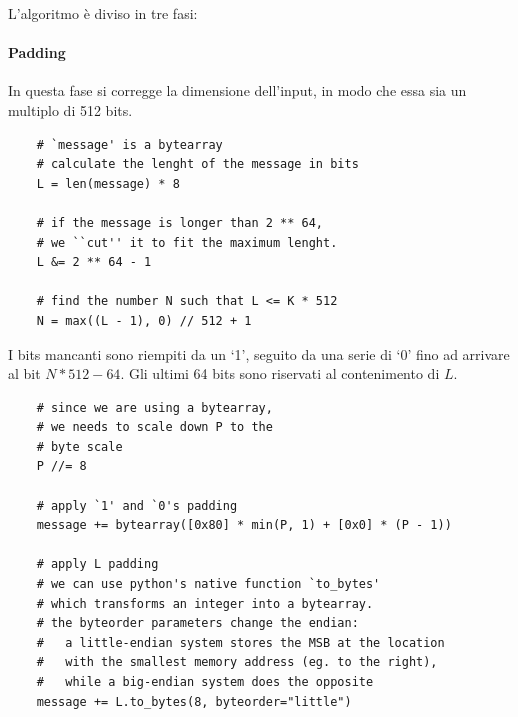 L'algoritmo è diviso in tre fasi:

\paragraph{Padding}
In questa fase si corregge la dimensione dell'input, in modo che essa sia un multiplo di 512 bits.
\lstset{language=python}
\begin{lstlisting}
    # `message' is a bytearray
    # calculate the lenght of the message in bits
    L = len(message) * 8

    # if the message is longer than 2 ** 64,
    # we ``cut'' it to fit the maximum lenght.
    L &= 2 ** 64 - 1

    # find the number N such that L <= K * 512
    N = max((L - 1), 0) // 512 + 1
\end{lstlisting}
I bits mancanti sono riempiti da un `1', seguito da una serie di `0' fino ad arrivare al bit $N * 512 - 64$. Gli ultimi 64 bits sono riservati al contenimento di $L$.
\begin{lstlisting}
    # since we are using a bytearray,
    # we needs to scale down P to the
    # byte scale
    P //= 8

    # apply `1' and `0's padding
    message += bytearray([0x80] * min(P, 1) + [0x0] * (P - 1))

    # apply L padding
    # we can use python's native function `to_bytes'
    # which transforms an integer into a bytearray.
    # the byteorder parameters change the endian:
    #   a little-endian system stores the MSB at the location 
    #   with the smallest memory address (eg. to the right),
    #   while a big-endian system does the opposite
    message += L.to_bytes(8, byteorder="little")
\end{lstlisting}


